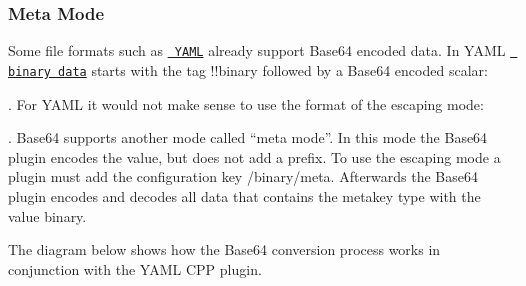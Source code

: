 \begin{DoxyCode}{0}
\DoxyCodeLine{}
\DoxyCodeLine{}
\DoxyCodeLine{}
\DoxyCodeLine{}
\end{DoxyCode}
\hypertarget{autotoc_md52_autotoc_md58}{}\subsubsection{Meta Mode}\label{autotoc_md52_autotoc_md58}
Some file formats such as \href{http://yaml.org}{\texttt{ Y\+A\+ML}} already support Base64 encoded data. In Y\+A\+ML \href{http://yaml.org/type/binary.html}{\texttt{ binary data}} starts with the tag {\ttfamily !!binary} followed by a Base64 encoded scalar\+:


\begin{DoxyCode}{0}
\end{DoxyCode}


. For Y\+A\+ML it would not make sense to use the format of the escaping mode\+:


\begin{DoxyCode}{0}
\end{DoxyCode}


. Base64 supports another mode called “meta mode”. In this mode the Base64 plugin encodes the value, but does not add a prefix. To use the escaping mode a plugin must add the configuration key {\ttfamily /binary/meta}. Afterwards the Base64 plugin encodes and decodes all data that contains the metakey {\ttfamily type} with the value {\ttfamily binary}.

The diagram below shows how the Base64 conversion process works in conjunction with the Y\+A\+ML C\+PP plugin.

